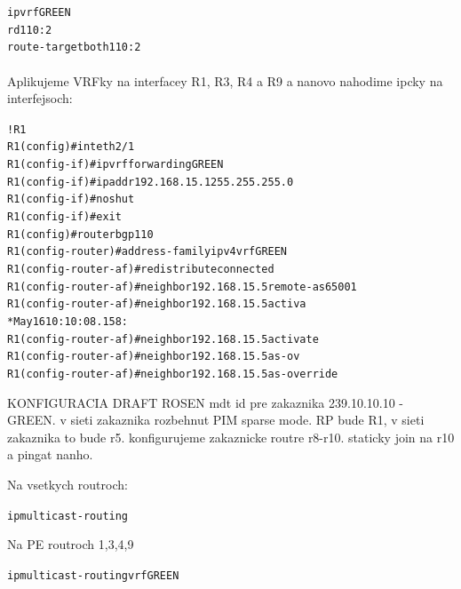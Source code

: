 \documentclass[12pt,twoside,a4paper]{report}
\begin{document}
\noindent
{\selectfont
\begin{small}
\begin{alltt}
ip vrf GREEN
  rd 110:2
  route-target both 110:2
\end{alltt}
\end{small}
}

\paragraph{}
Aplikujeme VRFky na interfacey R1, R3, R4 a R9 a nanovo nahodime ipcky na interfejsoch:

\noindent
{\selectfont
\begin{small}
\begin{alltt}
!R1
R1(config)#int eth2/1
R1(config-if)#ip vrf forwarding GREEN
R1(config-if)#ip addr 192.168.15.1 255.255.255.0
R1(config-if)#no shut
R1(config-if)#exit
R1(config)#router bgp 110          
R1(config-router)#address-family ipv4 vrf GREEN
R1(config-router-af)#redistribute connected
R1(config-router-af)#neighbor 192.168.15.5 remote-as 65001
R1(config-router-af)#neighbor 192.168.15.5 activa         
*May 16 10:10:08.158: %
R1(config-router-af)#neighbor 192.168.15.5 activate
R1(config-router-af)#neighbor 192.168.15.5 as-ov   
R1(config-router-af)#neighbor 192.168.15.5 as-override
\end{alltt}
\end{small}
}



KONFIGURACIA DRAFT ROSEN
mdt id pre zakaznika 239.10.10.10 - GREEN. v sieti zakaznika rozbehnut PIM sparse mode. RP bude R1, v sieti zakaznika to bude r5. konfigurujeme zakaznicke routre r8-r10. staticky join na r10 a pingat nanho.


Na vsetkych routroch:
\noindent
{\selectfont
\begin{small}
\begin{alltt}
ip multicast-routing
\end{alltt}
\end{small}
}




Na PE routroch 1,3,4,9

\noindent
{\selectfont
\begin{small}
\begin{alltt}
ip multicast-routing vrf GREEN
\end{alltt}
\end{small}
}
\end{document}
